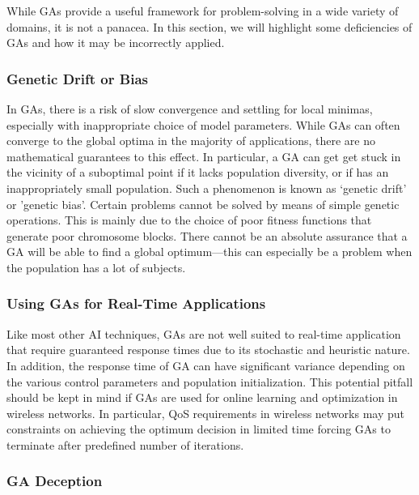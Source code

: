 \documentclass[journal]{IEEEtran}
\begin{document}
While GAs provide a useful framework for problem-solving in a wide variety of domains, it is not a panacea. In this section, we will highlight some deficiencies of GAs and how it may be incorrectly applied.

\vspace{2mm}
\subsubsection{Genetic Drift or Bias}

In GAs, there is a risk of slow convergence and settling for local minimas, especially with inappropriate choice of model parameters. While GAs can often converge to the global optima in the majority of applications, there are no mathematical guarantees to this effect. In particular, a GA can get get stuck in the vicinity of a suboptimal point if it lacks population diversity, or if has an inappropriately small population. Such a phenomenon is known as `genetic drift' or 'genetic bias'. Certain problems cannot be solved by means of simple genetic operations. This is mainly due to the choice of poor fitness functions that generate poor chromosome blocks. There cannot be an absolute assurance that a GA will be able to find a global optimum---this can especially be a problem when the population has a lot of subjects. 

\vspace{2mm}
\subsubsection{Using GAs for Real-Time Applications}

Like most other AI techniques, GAs are not well suited to real-time application that require guaranteed response times due to its stochastic and heuristic nature. In addition, the response time of GA can have significant variance depending on the various control parameters and population initialization. This potential pitfall should be kept in mind if GAs are used for online learning and optimization in wireless networks. In particular, QoS requirements in wireless networks may put constraints on achieving the optimum decision in limited time forcing GAs to terminate after predefined number of iterations.

\vspace{2mm}
\subsubsection{GA Deception}
\end{document}
